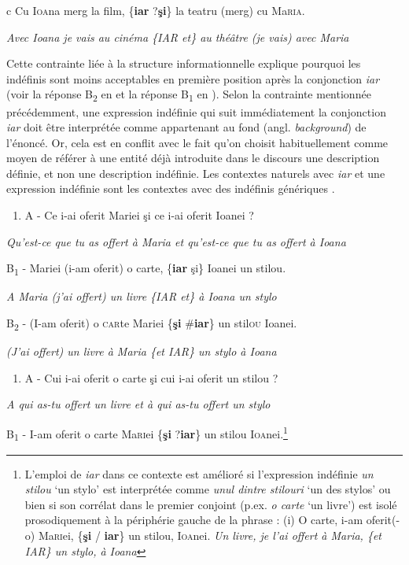  c  Cu I\textsc{oa}na merg la film, \{\textbf{iar} {\textbar} ?\textbf{şi}\} la teatru (merg) cu Ma\textsc{ria}.

{\itshape
Avec Ioana je vais au cinéma \{IAR {\textbar} et\} au théâtre (je vais) avec Maria} 

Cette contrainte liée à la structure informationnelle explique pourquoi les indéfinis sont moins acceptables en première position après la conjonction \textit{iar} (voir la réponse B\textsubscript{2} en  et la réponse B\textsubscript{1} en ). Selon la contrainte mentionnée précédemment, une expression indéfinie qui suit immédiatement la conjonction \textit{iar} doit être interprétée comme appartenant au fond (angl. \textit{background}) de l'énoncé. Or, cela est en conflit avec le fait qu'on choisit habituellement comme moyen de référer à une entité déjà introduite dans le discours une description définie, et non une description indéfinie. Les contextes naturels avec \textit{iar} et une expression indéfinie sont les contextes avec des indéfinis génériques . 


\begin{enumerate}
\item \label{bkm:Ref301979316}A  - Ce i-ai oferit Mariei şi ce i-ai oferit Ioanei ?


\end{enumerate}
{\itshape
Qu'est-ce que tu as offert à Maria et qu'est-ce que tu as offert à Ioana}

  B\textsubscript{1}  - Mariei (i-am oferit) o carte, \{\textbf{iar} {\textbar} şi\} Ioanei un stilou.

{\itshape
A Maria (j'ai offert) un livre \{IAR {\textbar} et\} à Ioana un stylo}

  B\textsubscript{2}  - (I-am oferit) o \textsc{car}te Mariei \{\textbf{şi} {\textbar} \#\textbf{iar}\} un stil\textsc{ou} Ioanei.

{\itshape
(J'ai offert) un livre à Maria \{et {\textbar} IAR\} un stylo à Ioana} 


\begin{enumerate}
\item \label{bkm:Ref301979318}A  - Cui i-ai oferit o carte şi cui i-ai oferit un stilou ?


\end{enumerate}
{\itshape
A qui as-tu offert un livre et à qui as-tu offert un stylo}

  B\textsubscript{1}  - I-am oferit o carte Ma\textsc{ri}ei \{\textbf{şi} {\textbar} ?\textbf{iar}\} un stilou I\textsc{oa}nei.\footnote{L'emploi de \textit{iar} dans ce contexte est amélioré si l'expression indéfinie \textit{un stilou} `un stylo' est interprétée comme \textit{unul dintre stilouri} `un des stylos' ou bien si son corrélat dans le premier conjoint (p.ex. \textit{o carte} `un livre') est isolé prosodiquement à la périphérie gauche de la phrase :
(i)  O carte, i-am oferit(-o) Ma\textsc{ri}ei, \{\textbf{şi} / \textbf{iar}\} un stilou, I\textsc{oa}nei.
  \textit{Un livre, je l'ai offert à Maria, \{et {\textbar} IAR\} un stylo, à Ioana}}

